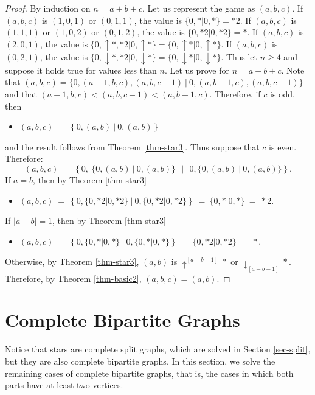 \documentclass[a4paper,11pt]{article}
\begin{document}
\begin{proof}
By induction on $n=a+b+c$. Let us represent the game as $(a,b,c)$.
If $(a,b,c)$ is $(1,0,1)$ or $(0,1,1)$, the value is $\{0,*|0,*\}=*2$.
If $(a,b,c)$ is $(1,1,1)$ or $(1,0,2)$ or $(0,1,2)$, the value is $\{0,*2|0,*2\}=*$.
If $(a,b,c)$ is $(2,0,1)$, the value is $\{0,\uparrow*,*2|0,\uparrow*\}=\{0,\uparrow*|0,\uparrow*\}$.
If $(a,b,c)$ is $(0,2,1)$, the value is $\{0,\downarrow*,*2|0,\downarrow*\}=\{0,\downarrow*|0,\downarrow*\}$.
Thus let $n\geq 4$ and suppose it holds true for values less than $n$. Let us prove for $n=a+b+c$.
Note that $(a,b,c)=\{0,(a-1,b,c),(a,b,c-1)\ |\ 0,(a,b-1,c),(a,b,c-1)\}$ and that $(a-1,b,c)<(a,b,c-1)<(a,b-1,c)$.
Therefore, if $c$ is odd, then
\begin{itemize}
\item $(a,b,c)\ =\ \left\{0,(a,b)\ \big|\ 0,(a,b)\right\}$
\end{itemize}
and the result follows from Theorem \ref{thm-star3}.
Thus suppose that $c$ is even. Therefore:
$$(a,b,c)\ =\ \left\{0,\ \{0,(a,b)\ |\ 0,(a,b)\}\ \ \ \Big|\ \ \ 0,\{0,(a,b)\ |\ 0,(a,b)\}\right\}.$$
If $a=b$, then by Theorem \ref{thm-star3}
\begin{itemize}
\item $(a,b,c)\ =\ \left\{0,\{0,*2|0,*2\}\ \big|\ 0,\{0,*2|0,*2\}\right\}\ =\ \{0,*|0,*\}\ =\ *2$.
\end{itemize}
If $|a-b|=1$, then by Theorem \ref{thm-star3}
\begin{itemize}
\item $(a,b,c)\ =\ \left\{0,\{0,*|0,*\}\ \big|\ 0,\{0,*|0,*\}\right\}\ =\ \{0,*2|0,*2\}\ =\ *$.
\end{itemize}
Otherwise, by Theorem \ref{thm-star3}, $(a,b)$ is $\uparrow^{[a-b-1]}*$ or $\downarrow_{[a-b-1]}*$.
Therefore, by Theorem \ref{thm-basic2}, $(a,b,c) = (a,b)$.
\end{proof}


\section{Complete Bipartite Graphs}\label{sec-bip}

Notice that stars are complete split graphs, which are solved in Section \ref{sec-split}, but they are also complete bipartite graphs.
In this section, we solve the remaining cases of complete bipartite graphs, that is, the cases in which both parts have at least two vertices.
\end{document}
